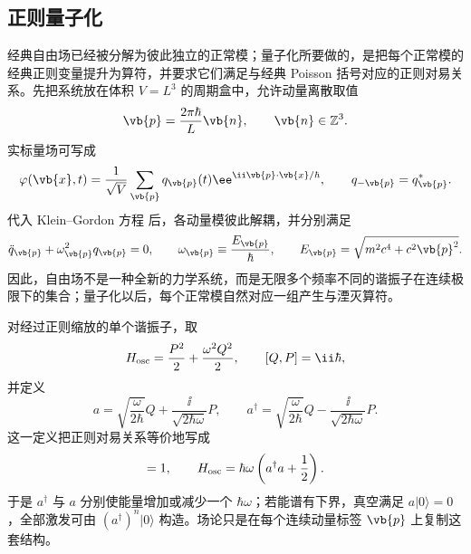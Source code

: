 \subsection{正则量子化}

经典自由场已经被分解为彼此独立的正常模；量子化所要做的，是把每个正常模的经典正则变量提升为算符，并要求它们满足与经典 Poisson 括号对应的正则对易关系。先把系统放在体积 $V=L^3$ 的周期盒中，允许动量离散取值
\begin{equation*}
 \vb{p}=\frac{2\pi\hbar}{L}\vb{n},
 \qquad \vb{n}\in\mathbb Z^3.
\end{equation*}
实标量场可写成
\begin{equation*}
 \varphi(\vb{x},t)
 =\frac1{\sqrt V}\sum_{\vb{p}}q_{\vb{p}}(t)
 \ee^{\ii\vb{p}\cdot\vb{x}/\hbar},
 \qquad q_{-\vb{p}}=q_{\vb{p}}^*.
\end{equation*}
代入 Klein--Gordon 方程  后，各动量模彼此解耦，并分别满足
\begin{equation}
 \ddot q_{\vb{p}}+\omega_{\vb{p}}^2q_{\vb{p}}=0,
 \qquad
 \omega_{\vb{p}}\equiv\frac{E_{\vb{p}}}{\hbar},
 \qquad
 E_{\vb{p}}=\sqrt{m^2c^4+c^2\vb{p}^2}.
 \label{eq:kg-mode-frequency-r2}
\end{equation}
因此，自由场不是一种全新的力学系统，而是无限多个频率不同的谐振子在连续极限下的集合；量子化以后，每个正常模自然对应一组产生与湮灭算符。

对经过正则缩放的单个谐振子，取
\begin{equation*}
 H_{\rm osc}=\frac{P^2}{2}+\frac{\omega^2Q^2}{2},
 \qquad [Q,P]=\ii\hbar,
\end{equation*}
并定义
\begin{equation}
 a=\sqrt{\frac{\omega}{2\hbar}}Q
 +\frac{\ii}{\sqrt{2\hbar\omega}}P,
 \qquad
 a^\dagger=\sqrt{\frac{\omega}{2\hbar}}Q
 -\frac{\ii}{\sqrt{2\hbar\omega}}P.
 \label{eq:sho-ladder-r3}
\end{equation}
这一定义把正则对易关系等价地写成
\begin{equation}
 [a,a^\dagger]=1,
 \qquad
 H_{\rm osc}=\hbar\omega\left(a^\dagger a+\frac12\right).
 \label{eq:sho-H-r3}
\end{equation}
于是 $a^\dagger$ 与 $a$ 分别使能量增加或减少一个 $\hbar\omega$；若能谱有下界，真空满足 $a|0\rangle=0$，全部激发可由 $(a^\dagger)^n|0\rangle$ 构造。场论只是在每个连续动量标签 $\vb{p}$ 上复制这套结构。


